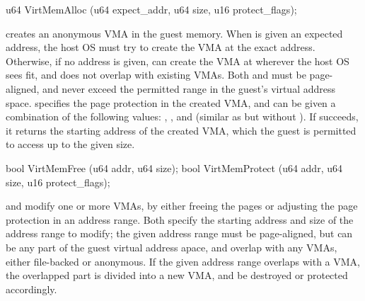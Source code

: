 \begin{paldef}
u64  VirtMemAlloc   (u64 expect_addr, u64 size,
                     u16 protect_flags);
\end{paldef}


 creates an anonymous VMA in the guest memory. When  is given an expected address, the host OS must try to create the VMA at the exact address.
Otherwise, if no address is given,  can create the VMA at wherever the host OS sees fit, and does not overlap with existing VMAs.
Both  and 
must be page-aligned, and never exceed the permitted range in the guest's virtual address space.
 specifies the page protection in the created VMA, and can be given a combination of the following values: , , and  (similar as  but without ).
If  succeeds, it returns the starting address
of the created VMA, which the guest is permitted to access up to the given size.





\begin{paldef}
bool VirtMemFree    (u64 addr, u64 size);
bool VirtMemProtect (u64 addr, u64 size,
                     u16 protect_flags);
\end{paldef}


 and  modify one or more VMAs, 
by either freeing the pages
or adjusting the page protection in an address range.
Both \hostapis{} specify the starting address and size of the address range to modify;
the given address range must be page-aligned,
but can be any part of the guest virtual address apace,
and overlap with any VMAs, either file-backed or anonymous.
If the given address range overlaps with a VMA, the overlapped part is divided into a new VMA, and be destroyed or protected accordingly.


 






